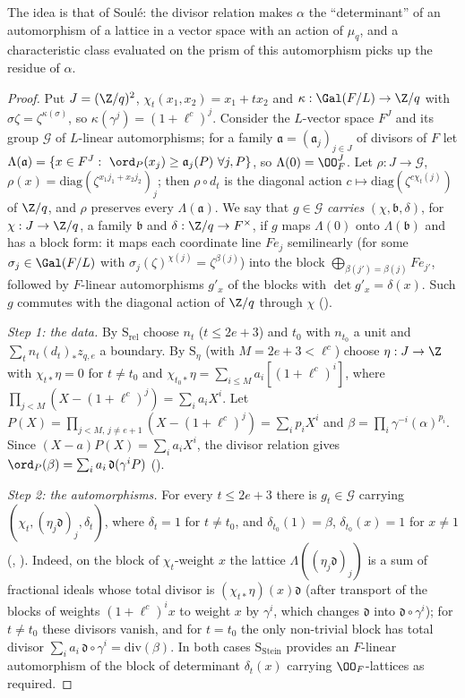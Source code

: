 The idea is that of Soul\'e: the divisor relation makes $\alpha$ the ``determinant'' of an automorphism of a lattice in a vector
space with an action of $\mu_q$, and a characteristic class evaluated on the prism of this automorphism picks up the residue of
$\alpha$.

\begin{proof}
Put $J=(\Z/q)^2$, $\chi_t(x_1,x_2)=x_1+tx_2$ and $\kappa:\Gal(F/L)\to\Z/q$ with $\sigma\zeta=\zeta^{\kappa(\sigma)}$, so
$\kappa(\gamma^j)=(1+\ell^c)^j$. Consider the $L$-vector space $F^J$ and its group $\mathcal G$ of $L$-linear automorphisms; for a family
$\mathfrak a=(\mathfrak a_j)_{j\in J}$ of divisors of $F$ let $\Lambda(\mathfrak a)=\{x\in F^J:\ \ord_P(x_j)\ge\mathfrak a_j(P)\ \forall
j,P\}$, so $\Lambda(0)=\OO_F^J$. Let $\rho:J\to\mathcal G$, $\rho(x)=\mathrm{diag}(\zeta^{x_1j_1+x_2j_2})_j$; then $\rho\circ d_t$ is the
diagonal action $c\mapsto\mathrm{diag}(\zeta^{c\chi_t(j)})$ of $\Z/q$, and $\rho$ preserves every $\Lambda(\mathfrak a)$.
We say that $g\in\mathcal G$ \emph{carries} $(\chi,\mathfrak b,\delta)$, for $\chi:J\to\Z/q$, a family $\mathfrak b$ and
$\delta:\Z/q\to F^\times$, if $g$ maps $\Lambda(0)$ onto $\Lambda(\mathfrak b)$ and has a block form: it maps each coordinate line
$Fe_j$ semilinearly (for some $\sigma_j\in\Gal(F/L)$ with $\sigma_j(\zeta)^{\chi(j)}=\zeta^{\beta(j)}$) into the block $\bigoplus_{\beta(j')=
\beta(j)}Fe_{j'}$, followed by $F$-linear automorphisms $g'_x$ of the blocks with $\det g'_x=\delta(x)$. Such $g$ commutes with
the diagonal action of $\Z/q$ through $\chi$ ().

\emph{Step 1: the data.} By $\mathrm S_{\mathrm{rel}}$ choose $n_t$ ($t\le2e+3$) and $t_0$ with $n_{t_0}$ a unit and
$\sum_tn_t(d_t)_*z_{q,e}$ a boundary. By $\mathrm S_\eta$ (with $M=2e+3<\ell^c$) choose $\eta:J\to\Z$ with
$\chi_{t*}\eta=0$ for $t\ne t_0$ and $\chi_{t_0*}\eta=\sum_{i\le M}a_i[(1+\ell^c)^i]$, where
$\prod_{j<M}(X-(1+\ell^c)^j)=\sum_ia_iX^i$. Let $P(X)=\prod_{j<M,\,j\ne e+1}(X-(1+\ell^c)^j)=\sum_ip_iX^i$ and
$\beta=\prod_i\gamma^{-i}(\alpha)^{p_i}$. Since $(X-a)P(X)=\sum_ia_iX^i$, the divisor relation gives
$\ord_P(\beta)=\sum_ia_i\,\mathfrak d(\gamma^iP)$ ().

\emph{Step 2: the automorphisms.} For every $t\le2e+3$ there is $g_t\in\mathcal G$ carrying $(\chi_t,(\eta_j\mathfrak d)_j,\delta_t)$,
where $\delta_t=1$ for $t\ne t_0$, and $\delta_{t_0}(1)=\beta$, $\delta_{t_0}(x)=1$ for $x\ne1$
(, ). Indeed, on the block of $\chi_t$-weight $x$
the lattice $\Lambda((\eta_j\mathfrak d)_j)$ is a sum of fractional ideals whose total divisor is $(\chi_{t*}\eta)(x)\mathfrak d$
(after transport of the blocks of weights $(1+\ell^c)^ix$ to weight $x$ by $\gamma^i$, which changes $\mathfrak d$ into
$\mathfrak d\circ\gamma^i$); for $t\ne t_0$ these divisors vanish, and for $t=t_0$ the only non-trivial block has total divisor
$\sum_ia_i\,\mathfrak d\circ\gamma^i=\mathrm{div}(\beta)$. In both cases $\mathrm S_{\mathrm{Stein}}$ provides an $F$-linear
automorphism of the block of determinant $\delta_t(x)$ carrying $\OO_F$-lattices as required.


\end{proof}
